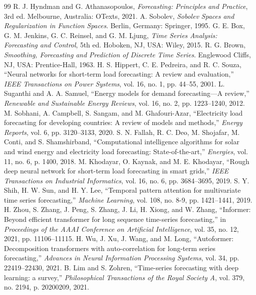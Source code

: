 \documentclass[journal]{IEEEtran}
\begin{document}
\begin{table}[t]
\begin{thebibliography}{99}
 R. J. Hyndman and G. Athanasopoulos, \textit{Forecasting: Principles and Practice}, 3rd ed. Melbourne, Australia: OTexts, 2021.
 A. Sobolev, \textit{Sobolev Spaces and Regularization in Function Spaces}. Berlin, Germany: Springer, 1995.
 G. E. Box, G. M. Jenkins, G. C. Reinsel, and G. M. Ljung, \textit{Time Series Analysis: Forecasting and Control}, 5th ed. Hoboken, NJ, USA: Wiley, 2015.
 R. G. Brown, \textit{Smoothing, Forecasting and Prediction of Discrete Time Series}. Englewood Cliffs, NJ, USA: Prentice-Hall, 1963.
 H. S. Hippert, C. E. Pedreira, and R. C. Souza, ``Neural networks for short-term load forecasting: A review and evaluation,'' \textit{IEEE Transactions on Power Systems}, vol. 16, no. 1, pp. 44--55, 2001.
 L. Suganthi and A. A. Samuel, ``Energy models for demand forecasting---A review,'' \textit{Renewable and Sustainable Energy Reviews}, vol. 16, no. 2, pp. 1223--1240, 2012.
 M. Sobhani, A. Campbell, S. Sangam, and M. Ghafouri-Azar, ``Electricity load forecasting for developing countries: A review of models and methods,'' \textit{Energy Reports}, vol. 6, pp. 3120--3133, 2020.
 S. N. Fallah, R. C. Deo, M. Shojafar, M. Conti, and S. Shamshirband, ``Computational intelligence algorithms for solar and wind energy and electricity load forecasting: State-of-the-art,'' \textit{Energies}, vol. 11, no. 6, p. 1400, 2018.
 M. Khodayar, O. Kaynak, and M. E. Khodayar, ``Rough deep neural network for short-term load forecasting in smart grids,'' \textit{IEEE Transactions on Industrial Informatics}, vol. 16, no. 6, pp. 3684--3695, 2019.
 S. Y. Shih, H. W. Sun, and H. Y. Lee, ``Temporal pattern attention for multivariate time series forecasting,'' \textit{Machine Learning}, vol. 108, no. 8-9, pp. 1421--1441, 2019.
 H. Zhou, S. Zhang, J. Peng, S. Zhang, J. Li, H. Xiong, and W. Zhang, ``Informer: Beyond efficient transformer for long sequence time-series forecasting,'' in \textit{Proceedings of the AAAI Conference on Artificial Intelligence}, vol. 35, no. 12, 2021, pp. 11106--11115.
 H. Wu, J. Xu, J. Wang, and M. Long, ``Autoformer: Decomposition transformers with auto-correlation for long-term series forecasting,'' \textit{Advances in Neural Information Processing Systems}, vol. 34, pp. 22419--22430, 2021.
 B. Lim and S. Zohren, ``Time-series forecasting with deep learning: a survey,'' \textit{Philosophical Transactions of the Royal Society A}, vol. 379, no. 2194, p. 20200209, 2021.

\end{thebibliography}
\end{table}
\end{document}
